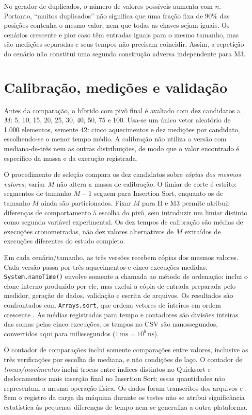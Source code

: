 No gerador de duplicados, o número de valores possíveis aumenta com $n$. Portanto, ``muitos duplicados'' não significa que uma fração fixa de 90\% das posições contenha o mesmo valor, nem que todas as chaves sejam iguais. Os cenários crescente e pior caso têm entradas iguais para o mesmo tamanho, mas são medições separadas e seus tempos não precisam coincidir. Assim, a repetição do cenário não constitui uma segunda construção adversa independente para M3.

\section{Calibração, medições e validação}

Antes da comparação, o híbrido com pivô final é avaliado com dez candidatos a $M$: 5, 10, 15, 20, 25, 30, 40, 50, 75 e 100. Usa-se um único vetor aleatório de 1.000 elementos, semente 42: cinco aquecimentos e dez medições por candidato, escolhendo-se o menor tempo médio. A calibração não utiliza a versão com mediana-de-três nem as outras distribuições, de modo que o valor encontrado é específico da massa e da execução registrada.

O procedimento de seleção compara os dez candidatos sobre \emph{cópias dos mesmos valores}; variar $M$ não altera a massa de calibração. O limiar de corte é estrito: segmentos de tamanho $M-1$ seguem para Insertion Sort, enquanto os de tamanho $M$ ainda são particionados. Fixar $M$ para H e M3 permite atribuir diferenças de comportamento à escolha do pivô, sem introduzir um limiar distinto como segunda variável experimental. Os dez tempos de calibração são médias de execuções cronometradas, não dez valores alternativos de $M$ extraídos de execuções diferentes do estudo completo.

Em cada cenário/tamanho, as três versões recebem cópias dos mesmos valores. Cada versão passa por três aquecimentos e cinco execuções medidas. \texttt{System.nanoTime()} envolve somente a chamada ao método de ordenação: inclui o clone interno produzido por ele, mas exclui a cópia de entrada preparada pelo medidor, geração de dados, validação e escrita de arquivos. Os resultados são confrontados com \texttt{Arrays.sort}, que ordena vetores de inteiros em ordem crescente \cite{oracle2021}. As médias registradas para tempo e contadores são divisões inteiras das somas pelas cinco execuções; os tempos no CSV são nanossegundos, convertidos aqui para milissegundos ($1\,\mathrm{ms}=10^6\,\mathrm{ns}$).

O contador de comparações inclui somente comparações entre valores, inclusive as três verificações por escolha de mediana, e não condições de laço. O contador de \emph{trocas/movimentos} inclui trocas entre índices distintos no Quicksort e deslocamentos mais inserção final no Insertion Sort; essas quantidades não representam a mesma operação física. Os dados foram transcritos dos arquivos  e . Sem o registro da carga da máquina durante os testes não se atribui significância estatística às pequenas diferenças de tempo nem se generaliza a outra plataforma.

